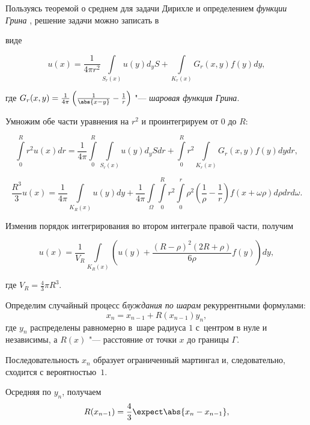     Пользуясь теоремой о среднем для задачи Дирихле и определением \emph{функции Грина} \cite{kuznetsov:Vladimirov},  решение задачи можно записать в

виде

$$

    u(x)=\frac{1}{4\pi r^2}\int\limits_{S_{r}(x)}u(y)d_yS+\int\limits_{K_r(x)}G_r(x,  y)f(y)dy,

$$

где ${G_r(x,  y)=\frac{1}{4\pi}\left(\frac{1}{\abs{x-y}}-\frac{1}{r}\right)}$ "--- \emph{шаровая функция Грина}.



Умножим обе части уравнения на $r^2$ и проинтегрируем от $0$ до $R$:

$$

        \int\limits_{0}^R r^2 u(x)dr=\frac{1}{4\pi}\int\limits_{0}^R\int\limits_{S_{r}(x)}u(y)d_yS dr+\int\limits_{0}^Rr^2\int\limits_{K_r(x)}G_r(x,

y)f(y)dy dr, $$

$$

        \frac{R^3}{3}u(x)=\frac{1}{4\pi}\int\limits_{K_{R}(x)}u(y)dy+\frac{1}{4\pi}\int\limits_\Omega\int\limits_{0}^R

r^2\int\limits_{0}^r\rho^2\left(\frac{1}{\rho}-\frac{1}{r}\right)f(x+\omega\rho)d\rho dr d\omega.

 $$

Изменив порядок интегрирования во втором интеграле правой части,  получим

\begin{equation}

    u(x)=\frac{1}{V_R}\int\limits_{K_{R}(x)}\left(u(y)+\frac{(R-\rho)^2(2R+\rho)}{6\rho}f(y)\right)d y,

    \label{kuznetsov:sol2}

\end{equation}

где $V_R=\frac{4}{3}\pi R^3$.



    Определим случайный процесс \emph{блуждания по шарам} рекуррентными формулами: $${x_n=x_{n-1}+R(x_{n-1})y_n},$$  где $y_n$ распределены равномерно в~шаре радиуса $1$ с~центром в нуле и независимы,  а $R(x)$ "--- расстояние от точки $x$ до границы $\Gamma$.

Последовательность $x_n$ образует ограниченный мартингал и,  следовательно,  сходится с вероятностью~$1$.

Осредняя по $y_n$,  получаем $$R(x_{n-1})=\frac{4}{3}\expect\abs{x_n-x_{n-1}},$$

